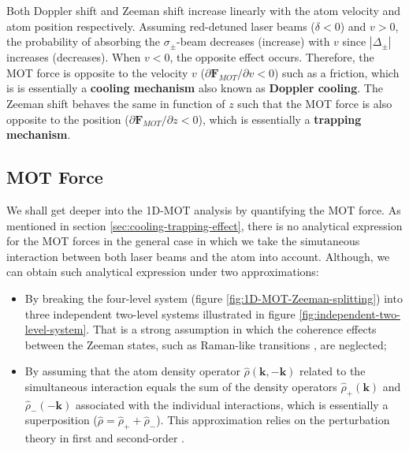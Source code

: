 Both Doppler shift and Zeeman shift increase linearly with the atom velocity and atom position respectively. Assuming red-detuned laser beams ($ \delta < 0 $) and $ v > 0 $, the probability of absorbing the $ \sigma_{\pm} $-beam decreases (increase) with $ v $ since $ |\Delta_{\pm}| $ increases (decreases). When $ v < 0 $, the opposite effect occurs. Therefore, the MOT force is opposite to the velocity $ v $ ($ \partial \mathbf{F}_{MOT} / \partial v < 0 $) such as a friction, which is is essentially a \textbf{cooling mechanism} also known as \textbf{Doppler cooling}. The Zeeman shift behaves the same in function of $ z $ such that the MOT force is also opposite to the position ($ \partial \mathbf{F}_{MOT} / \partial z < 0 $), which is essentially a \textbf{trapping mechanism}.

\subsection{MOT Force}
\label{sec:MOT-force}

We shall get deeper into the 1D-MOT analysis by quantifying the MOT force. As mentioned in section \ref{sec:cooling-trapping-effect}, there is no analytical expression for the MOT forces in the general case in which we take the simutaneous interaction between both laser beams and the atom into account. Although, we can obtain such analytical expression under two approximations:
\begin{itemize}
	\item By breaking the four-level system (figure \ref{fig:1D-MOT-Zeeman-splitting}) into three independent two-level systems illustrated in figure \ref{fig:independent-two-level-system}. That is a strong assumption in which the coherence effects between the Zeeman states, such as Raman-like transitions \cite[Section~9.8]{foot2005atomic}, are neglected;

	\item By assuming that the atom density operator $ \hat{\rho}(\mathbf{k}, -\mathbf{k}) $ related to the simultaneous interaction equals the sum of the density operators $ \hat{\rho}_{+}(\mathbf{k}) $ and $ \hat{\rho}_{-}(-\mathbf{k}) $ associated with the individual interactions, which is essentially a superposition ($ \hat{\rho} = \hat{\rho}_{+} + \hat{\rho}_{-} $). This approximation relies on the perturbation theory in first and second-order \cite[Chapter~7]{berman2011principles}. 
\end{itemize}

